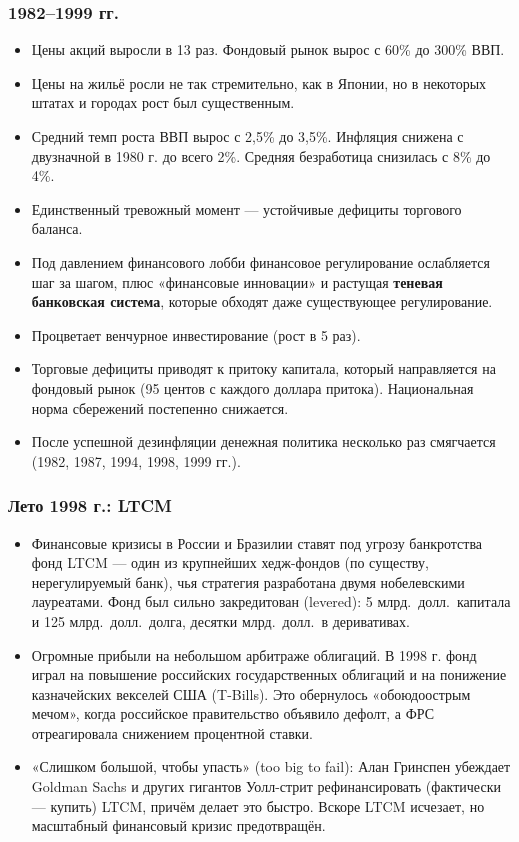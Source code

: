 \documentclass[10pt,a4paper]{article}
\begin{document}
\subsubsection{1982--1999 гг.}
\begin{itemize}[leftmargin=1.3em]
\item Цены акций выросли в 13 раз. Фондовый рынок вырос с 60\% до 300\% ВВП.
\item Цены на жильё росли не так стремительно, как в Японии, но в некоторых штатах и городах рост был существенным.
\item Средний темп роста ВВП вырос с 2,5\% до 3,5\%. Инфляция снижена с двузначной в 1980 г. до всего 2\%. Средняя безработица снизилась с 8\% до 4\%.
\item Единственный тревожный момент — устойчивые дефициты торгового баланса.
\item Под давлением финансового лобби финансовое регулирование ослабляется шаг за шагом, плюс «финансовые инновации» и растущая \textbf{теневая банковская система}, которые обходят даже существующее регулирование.
\item Процветает венчурное инвестирование (рост в 5 раз).
\item Торговые дефициты приводят к притоку капитала, который направляется на фондовый рынок (95 центов с каждого доллара притока). Национальная норма сбережений постепенно снижается.
\item После успешной дезинфляции денежная политика несколько раз смягчается (1982, 1987, 1994, 1998, 1999 гг.).
\end{itemize}

\subsubsection{Лето 1998 г.: LTCM}
\begin{itemize}[leftmargin=1.3em]
\item Финансовые кризисы в России и Бразилии ставят под угрозу банкротства фонд LTCM — один из крупнейших хедж-фондов (по существу, нерегулируемый банк), чья стратегия разработана двумя нобелевскими лауреатами. Фонд был сильно закредитован (levered): 5 млрд.\ долл.\ капитала и 125 млрд.\ долл.\ долга, десятки млрд.\ долл.\ в деривативах.
\item Огромные прибыли на небольшом арбитраже облигаций. В 1998 г. фонд играл на повышение российских государственных облигаций и на понижение казначейских векселей США (T-Bills). Это обернулось «обоюдоострым мечом», когда российское правительство объявило дефолт, а ФРС отреагировала снижением процентной ставки.
\item «Слишком большой, чтобы упасть» (too big to fail): Алан Гринспен убеждает Goldman Sachs и других гигантов Уолл-стрит рефинансировать (фактически — купить) LTCM, причём делает это быстро. Вскоре LTCM исчезает, но масштабный финансовый кризис предотвращён.
\end{itemize}
\end{document}
